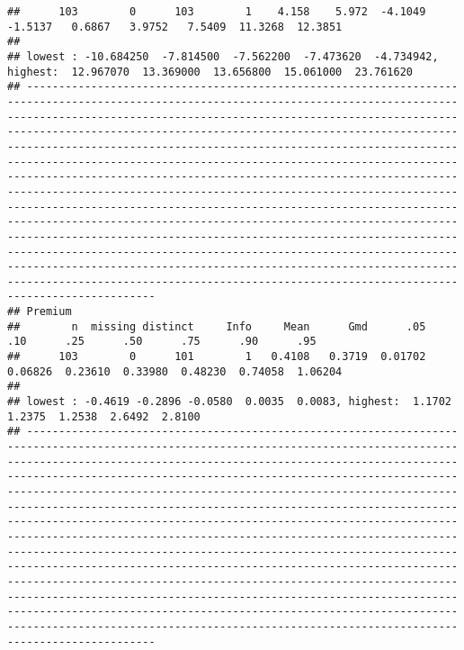 \documentclass[]{article}
\begin{document}
\begin{verbatim}
##      103        0      103        1    4.158    5.972  -4.1049  -1.5137   0.6867   3.9752   7.5409  11.3268  12.3851 
## 
## lowest : -10.684250  -7.814500  -7.562200  -7.473620  -4.734942, highest:  12.967070  13.369000  13.656800  15.061000  23.761620
## ----------------------------------------------------------------------------------------------------------------------------------------------------------------------------------------------------------------------------------------------------------------------------------------------------------------------------------------------------------------------------------------------------------------------------------------------------------------------------------------------------------------------------------------------------------------------------------------------------------------------------------------------------------------------------------------------------------------------------------------------------------------------------------------------------------------------------------------------------------------------------------------------------------------------------------------------------------------------------------------------------------------------------------------
## Premium 
##        n  missing distinct     Info     Mean      Gmd      .05      .10      .25      .50      .75      .90      .95 
##      103        0      101        1   0.4108   0.3719  0.01702  0.06826  0.23610  0.33980  0.48230  0.74058  1.06204 
## 
## lowest : -0.4619 -0.2896 -0.0580  0.0035  0.0083, highest:  1.1702  1.2375  1.2538  2.6492  2.8100
## ----------------------------------------------------------------------------------------------------------------------------------------------------------------------------------------------------------------------------------------------------------------------------------------------------------------------------------------------------------------------------------------------------------------------------------------------------------------------------------------------------------------------------------------------------------------------------------------------------------------------------------------------------------------------------------------------------------------------------------------------------------------------------------------------------------------------------------------------------------------------------------------------------------------------------------------------------------------------------------------------------------------------------------------

\end{verbatim}
\end{document}
